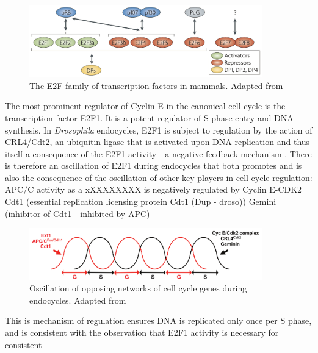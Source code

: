 \documentclass[11pt,twoside,a4paper]{report}
\begin{document}
				\begin{figure}[here]
					\centering
					\includegraphics[width=0.9\textwidth]{pngs/E2F_family.png}
					\caption{The E2F family of transcription factors in mammals. {\footnotesize Adapted from \cite{VandenHeuvel2008}}}
					\label{fig:E2F_family}
				\end{figure}
				
				The most prominent regulator of Cyclin E in the canonical cell cycle is the transcription factor E2F1. It is a potent regulator of S phase entry and DNA synthesis.
				In \textit{Drosophila} endocycles, E2F1 is subject to regulation by the action of CRL4/Cdt2, an ubiquitin ligase that is activated upon DNA replication and thus itself a consequence of the E2F1 activity - a negative feedback mechanism \cite{Zielke2011}\cite{Havens2011}\cite{Shibutani2008}.  There is therefore an oscillation of E2F1 during endocycles that both promotes and is also the consequence of the oscillation of other key players in cell cycle regulation: 
				APC/C activity as a xXXXXXXXX is negatively regulated by Cyclin E-CDK2
				Cdt1 (essential replication licensing protein Cdt1 (Dup - droso))
				Gemini (inhibitor of Cdt1 - inhibited by APC)
				
				\begin{figure}[here]
					\centering
					\includegraphics[width=0.9\textwidth]{pngs/oscilation.png}
					\caption{Oscillation of opposing networks of cell cycle genes during endocycles. {\footnotesize Adapted from \cite{Fox2013}}}
					\label{fig:oscillation}
				\end{figure}
				
				
				This is mechanism of regulation ensures DNA is replicated only once per S phase, and is consistent with the observation that E2F1 activity is necessary for 
				consistent 
			
\end{document}
